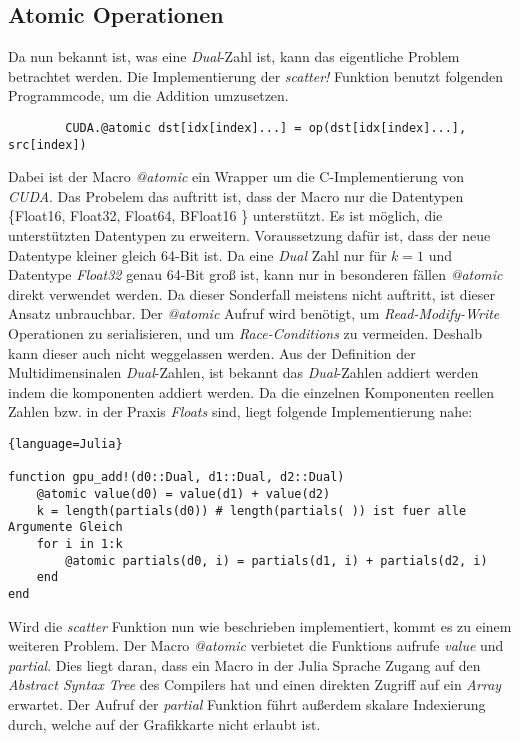 \subsection{Atomic Operationen} \label{atomic}

Da nun bekannt ist, was eine \textit{Dual}-Zahl ist, 
kann das eigentliche Problem betrachtet werden.
Die Implementierung der \textit{scatter!} Funktion benutzt folgenden Programmcode, um die 
Addition umzusetzen.

\begin{verbatim}
    	CUDA.@atomic dst[idx[index]...] = op(dst[idx[index]...], src[index])
\end{verbatim}


Dabei ist der Macro \textit{@atomic} ein Wrapper um die C-Implementierung von \textit{CUDA}.
Das Probelem das auftritt ist, dass der Macro nur die Datentypen \{Float16, Float32, Float64, BFloat16 \}
unterstützt.
Es ist möglich, die unterstützten Datentypen zu erweitern.
Voraussetzung dafür ist, dass der neue Datentype kleiner gleich 64-Bit ist.
Da eine \textit{Dual} Zahl nur für $k = 1$ und Datentype \textit{Float32} genau 64-Bit groß ist,
kann nur in besonderen fällen \textit{@atomic} direkt verwendet werden.
Da dieser Sonderfall meistens nicht auftritt, ist dieser Ansatz unbrauchbar.
Der \textit{@atomic} Aufruf wird benötigt,
um \textit{Read-Modify-Write} Operationen zu serialisieren, 
und um \textit{Race-Conditions} zu vermeiden. 
Deshalb kann dieser auch nicht weggelassen werden.
Aus der Definition der Multidimensinalen \textit{Dual}-Zahlen, 
ist bekannt das \textit{Dual}-Zahlen addiert werden indem die komponenten addiert werden.
Da die einzelnen Komponenten reellen Zahlen 
bzw. in der Praxis \textit{Floats} sind, liegt folgende Implementierung nahe:

\begin{lstlisting}{language=Julia}

function gpu_add!(d0::Dual, d1::Dual, d2::Dual)
	@atomic value(d0) = value(d1) + value(d2)
	k = length(partials(d0)) # length(partials( )) ist fuer alle Argumente Gleich
	for i in 1:k
		@atomic partials(d0, i) = partials(d1, i) + partials(d2, i)
	end
end

\end{lstlisting}

Wird die \textit{scatter} Funktion nun wie beschrieben implementiert, kommt es zu einem weiteren Problem.
Der Macro \textit{@atomic} verbietet die Funktions aufrufe \textit{value} und \textit{partial}.
Dies liegt daran, dass ein Macro in der Julia Sprache Zugang auf den \textit{Abstract Syntax Tree} des Compilers hat
und einen direkten Zugriff auf ein \textit{Array} erwartet.
Der Aufruf der \textit{partial} Funktion führt außerdem skalare Indexierung durch, welche auf der Grafikkarte nicht erlaubt ist.